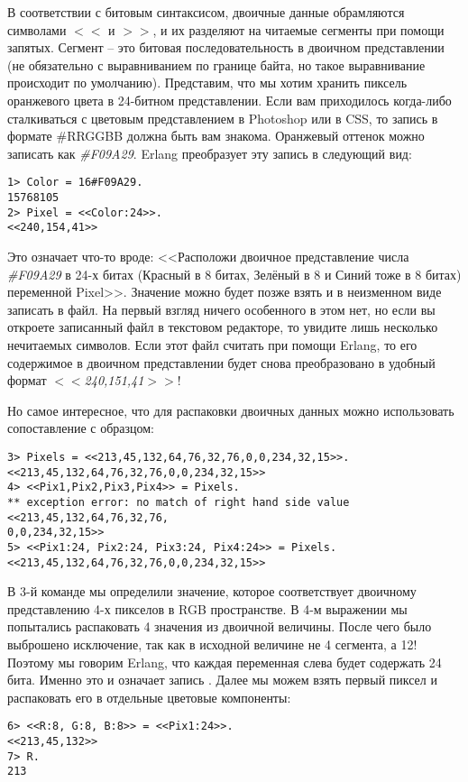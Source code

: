 В соответствии с битовым синтаксисом, двоичные данные обрамляются символами $<<$ и $>>$, и их разделяют на читаемые сегменты при помощи запятых.
Сегмент \--- это битовая последовательность в двоичном представлении (не обязательно с выравниванием по границе байта, но такое выравнивание происходит по умолчанию).
Представим, что мы хотим хранить пиксель оранжевого цвета в 24\--битном представлении.
Если вам приходилось когда\--либо сталкиваться с цветовым представлением в Photoshop или в CSS, то запись в формате \#RRGGBB должна быть вам знакома.
Оранжевый оттенок можно записать как \emph{\#F09A29}.
Erlang преобразует эту запись в следующий вид:
\begin{lstlisting}[style=repl]
1> Color = 16#F09A29.
15768105
2> Pixel = <<Color:24>>.
<<240,154,41>>
\end{lstlisting}

Это означает что\--то вроде: <<Расположи двоичное представление числа \emph{\#F09A29} в 24\--х битах (Красный в 8 битах, Зелёный в 8 и Синий тоже в 8 битах) переменной Pixel>>.
Значение можно будет позже взять и в неизменном виде записать в файл.
На первый взгляд ничего особенного в этом нет, но если вы откроете записанный файл в текстовом редакторе, то увидите лишь несколько нечитаемых символов.
Если этот файл считать при помощи Erlang, то его содержимое в двоичном представлении будет снова преобразовано в удобный формат \emph{$<<$240,151,41$>>$}!

Но самое интересное, что для распаковки двоичных данных можно использовать сопоставление с образцом:
\begin{lstlisting}[style=repl]
3> Pixels = <<213,45,132,64,76,32,76,0,0,234,32,15>>.
<<213,45,132,64,76,32,76,0,0,234,32,15>>
4> <<Pix1,Pix2,Pix3,Pix4>> = Pixels.
** exception error: no match of right hand side value <<213,45,132,64,76,32,76,
0,0,234,32,15>>
5> <<Pix1:24, Pix2:24, Pix3:24, Pix4:24>> = Pixels.
<<213,45,132,64,76,32,76,0,0,234,32,15>>
\end{lstlisting}

В 3\--й команде мы определили значение, которое соответствует двоичному представлению 4\--х пикселов в RGB пространстве.
В 4\--м выражении мы попытались распаковать 4 значения из двоичной величины.
После чего было выброшено исключение, так как в исходной величине не 4 сегмента, а 12!
Поэтому мы говорим Erlang, что каждая переменная слева будет содержать 24 бита.
Именно это и означает запись .
Далее мы можем взять первый пиксел и распаковать его в отдельные цветовые компоненты:
\begin{lstlisting}[style=repl]
6> <<R:8, G:8, B:8>> = <<Pix1:24>>.
<<213,45,132>>
7> R.
213
\end{lstlisting}

